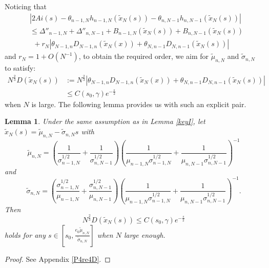 \documentclass[11pt]{article}
\newtheorem{lemma}[theorem]{Lemma}
\numberwithin{equation}{section}%
\numberwithin{theorem}{section}
\begin{document}
Noticing that
\begin{equation*}
\begin{split}
&|2Ai(s)-\theta_{n-1,N}h_{n-1,N}(\tilde{x}_N(s))-\theta_{n,N-1}h_{n,N-1}(\tilde{x}_N(s))|\\&
\le\Delta''_{n-1,N}+\Delta''_{n,N-1}+B_{n-1,N}(\tilde{x}_N(s))+B_{n,N-1}(\tilde{x}_N(s))\\
&~~+r_N|\theta_{N-1,n}D_{N-1,n}(\tilde{x}_N(x))+\theta_{N,n-1}D_{N,n-1}(\tilde{x}_N(s))|
\end{split}
\end{equation*}
and $r_N=1+O(N^{-1})$, to obtain the required order, we aim for $\tilde{\mu}_{n,N}$ and $\tilde{\sigma}_{n,N}$ to satisfy:
\begin{equation*}
\begin{split}
       N^{\frac{2}{3}}D(\tilde{x}_N(s))&:=N^{\frac{2}{3}}|\theta_{N-1,n}D_{N-1,n}(\tilde{x}_N(x))+\theta_{N,n-1}D_{N,n-1}(\tilde{x}_N(s))|\\&\le C(s_0,\gamma)e^{-\frac{s}{2}}
\end{split}
\end{equation*}
when $N$ is large.
The following lemma provides us with such an explicit pair.
\begin{lemma}\label{re4D}
Under the same assumption as in Lemma \ref{keyI}, let $\tilde{x}_N(s)=\tilde{\mu}_{n,N}-\tilde{\sigma}_{n,N}s$ with
\begin{equation}\label{recenter}
    \tilde{\mu}_{n,N}=\left(\frac{1}{\sigma_{n-1,N}^{1/2}}+\frac{1}{\sigma_{n,N-1}^{1/2}}\right)\left(\frac{1}{\mu_{n-1,N}\sigma_{n-1,N}^{1/2}}+\frac{1}{\mu_{n,N-1}\sigma_{n,N-1}^{1/2}}\right)^{-1}
\end{equation}
and
\begin{equation}\label{rescal}
    \tilde{\sigma}_{n,N}=\left(\frac{\sigma_{n-1,N}^{1/2}}{\mu_{n-1,N}}+\frac{\sigma_{n,N-1}^{1/2}}{\mu_{n,N-1}}\right)\left(\frac{1}{\mu_{n-1,N}\sigma_{n-1,N}^{1/2}}+\frac{1}{\mu_{n,N-1}\sigma_{n,N-1}^{1/2}}\right)^{-1}.
\end{equation} 
Then
\begin{equation*}
    N^{\frac{2}{3}}D(\tilde{x}_N(s))\le C(s_0,\gamma)e^{-\frac{s}{2}}
\end{equation*}
holds for any $s\in\left[s_0,\frac{e_0\tilde{\mu}_{n,N}}{\tilde{\sigma}_{n,N}}\right]$ when $N$ large enough.
\end{lemma}
\begin{proof}
    See Appendix \ref{P4re4D}.
\end{proof}
\end{document}
